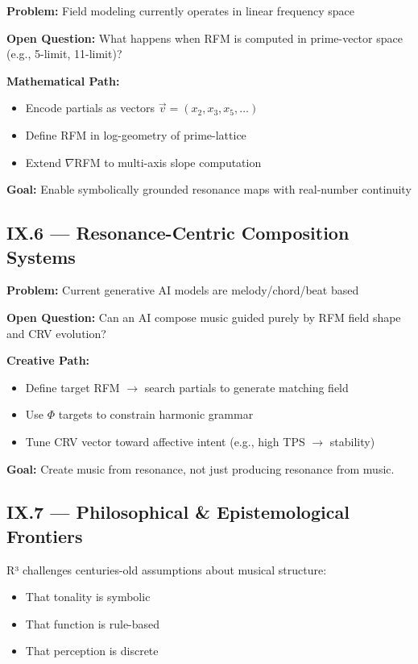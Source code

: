 \textbf{Problem:}  
Field modeling currently operates in linear frequency space

\textbf{Open Question:}  
What happens when RFM is computed in prime-vector space (e.g., 5-limit, 11-limit)?

\textbf{Mathematical Path:}
\begin{itemize}
    \item Encode partials as vectors $\vec{v} = (x_2, x_3, x_5, \ldots)$
    \item Define RFM in log-geometry of prime-lattice
    \item Extend $\nabla$RFM to multi-axis slope computation
\end{itemize}

\textbf{Goal:}  
Enable symbolically grounded resonance maps with real-number continuity

\subsection*{IX.6 — Resonance-Centric Composition Systems}

\textbf{Problem:}  
Current generative AI models are melody/chord/beat based

\textbf{Open Question:}  
Can an AI compose music guided purely by RFM field shape and CRV evolution?

\textbf{Creative Path:}
\begin{itemize}
    \item Define target RFM $\rightarrow$ search partials to generate matching field
    \item Use $\Phi$ targets to constrain harmonic grammar
    \item Tune CRV vector toward affective intent (e.g., high TPS $\rightarrow$ stability)
\end{itemize}

\textbf{Goal:}  
Create music from resonance, not just producing resonance from music.

\subsection*{IX.7 — Philosophical \& Epistemological Frontiers}

R³ challenges centuries-old assumptions about musical structure:

\begin{itemize}
    \item That tonality is symbolic
    \item That function is rule-based
    \item That perception is discrete
\end{itemize}

